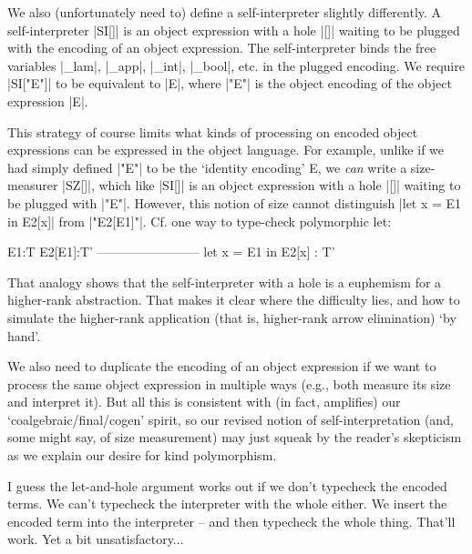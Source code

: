 \documentclass[preprint]{sigplanconf}
\begin{document}
We also (unfortunately need to) define a self-interpreter slightly
differently.  A self-interpreter |SI[]| is an object expression with a
hole |[]| waiting to be plugged with the encoding of an object expression.
The self-interpreter binds the free variables |_lam|, |_app|, |_int|, |_bool|,
etc. in the plugged encoding.  We require |SI["E"]| to be equivalent to |E|,
where |"E"| is the object encoding of the object expression |E|.

This strategy of course limits what kinds of processing on encoded
object expressions can be expressed in the object language.  For
example, unlike if we had simply defined |"E"| to be the `identity
encoding' E, we \emph{can} write a size-measurer |SZ[]|, which like |SI[]| is
an object expression with a hole |[]| waiting to be plugged with |"E"|.
However, this notion of size cannot distinguish |let x = E1 in E2[x]|
from |"E2[E1]"|.  Cf. one way to type-check polymorphic let:
\begin{code}
        E1:T    E2[E1]:T'
    ------------------------
    let x = E1 in E2[x] : T'
\end{code}
That analogy shows that the self-interpreter with a hole is a
euphemism for a higher-rank abstraction. That makes it clear where
the difficulty lies, and how to simulate the higher-rank application
(that is, higher-rank arrow elimination) `by hand'.


We also need to duplicate the encoding of an object expression if we
want to process the same object expression in multiple ways (e.g., both
measure its size and interpret it).  But all this is consistent with (in
fact, amplifies) our `coalgebraic/final/cogen' spirit, so our revised
notion of self-interpretation (and, some might say, of size measurement)
may just squeak by the reader's skepticism as we explain our desire for
kind polymorphism.

I guess the let-and-hole argument works out if we don't typecheck the
encoded terms. We can't typecheck the interpreter with the whole
either. We insert the encoded term into the interpreter -- and then
typecheck the whole thing. That'll work. Yet a bit unsatisfactory...
\end{document}
